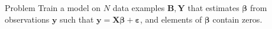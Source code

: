 \documentclass[9pt]{beamer}
\begin{document}

\begin{frame}{Problem}
      \centering
      {\color{red}Train a model on $N$ data examples $\mathbf{B}, \mathbf{Y}$} that estimates \(\boldsymbol\beta \) from observations \(\mathbf{y}\) such that \(\mathbf{y} = \mathbf{X} \boldsymbol\beta + \boldsymbol\varepsilon\), and elements of \(\boldsymbol\beta \) contain zeros. 
\end{frame}
\end{document}
